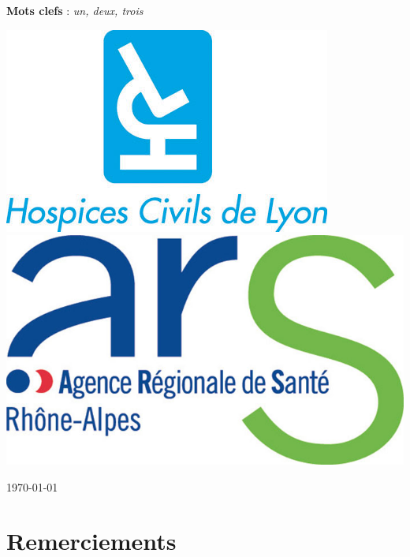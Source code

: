 \documentclass[11pt,a4paper]{article}
\theoremstyle{plain}
\theoremstyle{definition}
\begin{document}
\begin{center}
{} %


\vspace{0.5cm}

\parbox{15cm}{
\textbf{Mots clefs} : \it un, deux, trois
} %

\vspace{1.5cm}

\parbox{15cm}{

\includegraphics[scale=0.24]{images/logo-hcl-plein_2995-bleu.jpg} \hfill
\includegraphics[scale=0.15]{images/ARS-Auvergne-Rhone-Alpes.jpg}
} %

\vspace{0.5cm}
\vspace{0.5cm}
\end{center}

\vfill
\hfill \today
\newpage
\thispagestyle{empty}
\section*{Remerciements}
\end{document}
